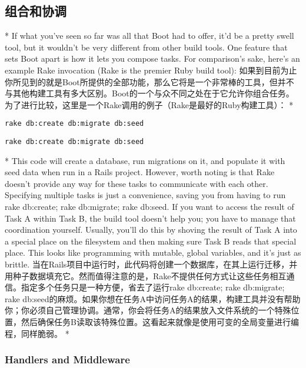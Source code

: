 \begin{paracol}{2}
\section{组合和协调}
\switchcolumn[0]*
If what you've seen so far was all that Boot had to offer, it'd be a
pretty swell tool, but it wouldn't be very different from other build
tools. One feature that sets Boot apart is how it lets you compose
tasks. For comparison's sake, here's an example Rake invocation (Rake is
the premier Ruby build tool):
\switchcolumn
如果到目前为止你所见到的就是Boot所提供的全部功能，那么它将是一个非常棒的工具，但并不与其他构建工具有多大区别。Boot的一个与众不同之处在于它允许你组合任务。为了进行比较，这里是一个Rake调用的例子（Rake是最好的Ruby构建工具）：
\switchcolumn[0]*
\begin{verbatim}
rake db:create db:migrate db:seed
\end{verbatim}
\switchcolumn
\begin{verbatim}
rake db:create db:migrate db:seed
\end{verbatim}
\switchcolumn[0]*
This code will create a database, run migrations on it, and populate it
with seed data when run in a Rails project. However, worth noting is
that Rake doesn't provide any way for these tasks to communicate with
each other. Specifying multiple tasks is just a convenience, saving you
from having to run rake db:create; rake db:migrate; rake db:seed. If you
want to access the result of Task A within Task B, the build tool
doesn't help you; you have to manage that coordination yourself.
Usually, you'll do this by shoving the result of Task A into a special
place on the filesystem and then making sure Task B reads that special
place. This looks like programming with mutable, global variables, and
it's just as brittle.
\switchcolumn
当在Rails项目中运行时，此代码将创建一个数据库，在其上运行迁移，并用种子数据填充它。然而值得注意的是，Rake不提供任何方式让这些任务相互通信。指定多个任务只是一种方便，省去了运行rake db:create; rake db:migrate; rake db:seed的麻烦。如果你想在任务A中访问任务A的结果，构建工具并没有帮助你；你必须自己管理协调。通常，你会将任务A的结果放入文件系统的一个特殊位置，然后确保任务B读取该特殊位置。这看起来就像是使用可变的全局变量进行编程，同样脆弱。
\switchcolumn[0]*
\subsubsection{Handlers and Middleware}
\switchcolumn

\end{paracol}
